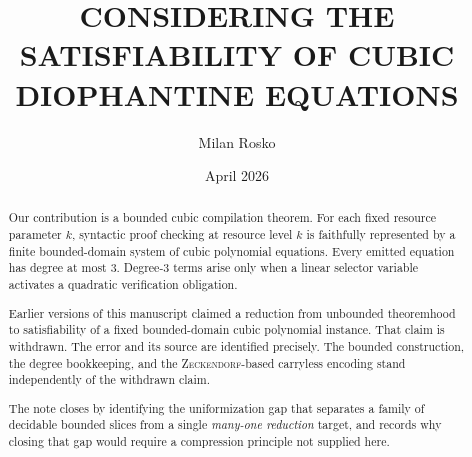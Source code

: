 \documentclass[letterpaper,10pt]{article}
\makeatletter
\renewcommand{\texttt}[1]{{\ttfamily #1}}
\renewcommand{\mathtt}[1]{\text{\texttt{#1}}} %
\theoremstyle{upright}
\theoremstyle{upright}
\renewcommand{\maketitle}{%
	\begin{center}
		\vfill
		{\fontsize{18pt}{19pt}\selectfont \@title \par}
		\vspace{1em}
		{\normalsize \@author \par}
		\vspace{0.1em}
		{\normalsize \@date \par}
	\end{center}
}
\makeatother
\begin{document}
\newcommand{\Z}{\mathbb{Z}}
\newcommand{\N}{\mathbb{N}}
\newcommand{\Q}{\mathbb{Q}}

\newcommand{\mult}{\mathtt{Mult}}

\newcommand{\HtenZ}{{\rm H}\Z}
\newcommand{\HtenN}{{\rm H}\N}
\newcommand{\HtenQ}{{\rm H}\Q}
\newcommand{\Hten}[3]{\mathrm{H}{#1}(#2,#3)}
\newcommand{\D}{\mathsf{D}}
\newcommand{\U}{\mathsf{U}}
\newcommand{\TheoryT}{\mathrm{T}}

\newcommand{\Prov}{\operatorname{Prov}}
\newcommand{\ProvRA}{\operatorname{Prov}_{\TheoryT}}
\newcommand{\ProofRA}{\operatorname{Proof}_{\TheoryT}}
\newcommand{\FormPred}{\operatorname{Form}}
\newcommand{\Sent}{\operatorname{Sent}}
\newcommand{\SigmaOneSent}{\operatorname{Sigma1Sent}}
\newcommand{\SatSigmaOne}{\operatorname{Sat}_{\Sigma_1}}
\newcommand{\DiophThree}{\operatorname{Dioph}_3}
\newcommand{\RFNSigmaOne}{\operatorname{RFN}_{\Sigma_1}}


\title{\uppercase{Considering The\\
Satisfiability of Cubic\\
Diophantine Equations}}
\author{Milan Rosko}
\date{April 2026}

\maketitle


\begin{abstract}
\vspace{-1.5ex}\footnotesize{
	Our contribution is a bounded cubic compilation theorem. For each fixed resource parameter $k$, syntactic proof checking at resource level $k$ is faithfully represented by a finite bounded-domain system of cubic polynomial equations. Every emitted equation has degree at most 3. Degree-3 terms arise only when a linear selector variable activates a quadratic verification obligation.

	Earlier versions of this manuscript claimed a reduction from unbounded theoremhood to satisfiability of a fixed bounded-domain cubic polynomial instance. That claim is withdrawn. The error and its source are identified precisely. The bounded construction, the degree bookkeeping, and the \textsc{Zeckendorf}-based carryless encoding stand independently of the withdrawn claim.

	The note closes by identifying the uniformization gap that separates a family of decidable bounded slices from a single \emph{many-one reduction} target, and records why closing that gap would require a compression principle not supplied here.
	}
\end{abstract}
\end{document}
